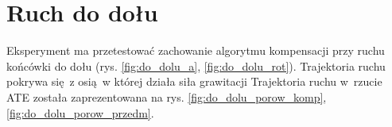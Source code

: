 
\section{Ruch do dołu}

Eksperyment ma przetestować zachowanie algorytmu kompensacji przy ruchu końcówki do dołu (rys. \ref{fig:do_dolu_a}, \ref{fig:do_dolu_rot}). Trajektoria ruchu pokrywa się z osią w której działa siła grawitacji Trajektoria ruchu w~rzucie ATE została zaprezentowana na rys. \ref{fig:do_dolu_porow_komp}, \ref{fig:do_dolu_porow_przedm}.

